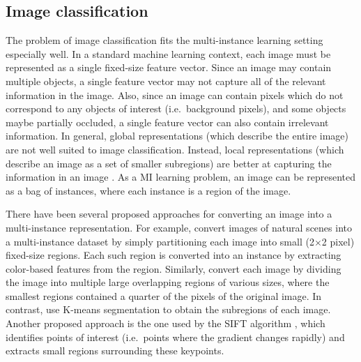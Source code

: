 \documentclass[a4paper,12pt]{report} %
\begin{document}
\subsection{Image classification}    
The problem of image classification fits the multi-instance learning setting especially well. 
In a standard machine learning context, each image must be represented as a single
    fixed-size feature vector.
Since an image may contain multiple objects,
    a single feature vector may not capture all 
    of the relevant information in the image.
Also, since an image can contain pixels 
    which do not correspond to any objects of interest (i.e.\ background pixels),
    and some objects maybe partially occluded,
    a single feature vector can also contain irrelevant information.
In general, global representations (which describe the entire image) 
    are not well suited to image classification. Instead, 
    local representations (which describe an image as a set of smaller subregions)
    are better at capturing the information in an image \cite{visObjRecog}.
As a MI learning problem, 
    an image can be represented as a bag of instances, 
    where each instance is a region of the image.

There have been several proposed approaches for converting an image into 
    a multi-instance representation.
For example,  convert images of natural scenes 
    into a multi-instance dataset by simply partitioning each image
    into small (2$\times$2 pixel) fixed-size regions.
Each such region is converted into an instance by extracting color-based
    features from the region.
Similarly,  convert each image by dividing the image into 
    multiple large overlapping regions of various sizes, 
    where the smallest regions contained a quarter of the pixels of the original image.
In contrast,  use K-means segmentation to obtain 
    the subregions of each image.
Another proposed approach is the one used by the SIFT algorithm \cite{SIFT},
    which identifies points of interest (i.e.\ points where the gradient changes rapidly)
    and extracts small regions surrounding these keypoints.
\end{document}
